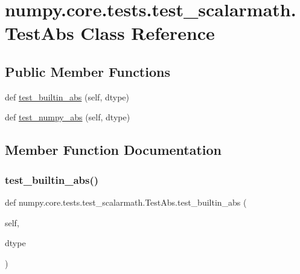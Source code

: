 \hypertarget{classnumpy_1_1core_1_1tests_1_1test__scalarmath_1_1TestAbs}{}\section{numpy.\+core.\+tests.\+test\+\_\+scalarmath.\+Test\+Abs Class Reference}
\label{classnumpy_1_1core_1_1tests_1_1test__scalarmath_1_1TestAbs}
\subsection*{Public Member Functions}
\begin{DoxyCompactItemize}
\item 
def \hyperlink{classnumpy_1_1core_1_1tests_1_1test__scalarmath_1_1TestAbs_a952d297e1e64a7bdae02256ceb433a2b}{test\+\_\+builtin\+\_\+abs} (self, dtype)
\item 
def \hyperlink{classnumpy_1_1core_1_1tests_1_1test__scalarmath_1_1TestAbs_af938a93e74a3d5d13735d5c15c204c6f}{test\+\_\+numpy\+\_\+abs} (self, dtype)
\end{DoxyCompactItemize}


\subsection{Member Function Documentation}
\mbox{\label{classnumpy_1_1core_1_1tests_1_1test__scalarmath_1_1TestAbs_a952d297e1e64a7bdae02256ceb433a2b}} 
\subsubsection{\texorpdfstring{test\+\_\+builtin\+\_\+abs()}{test\_builtin\_abs()}}
{\footnotesize\ttfamily def numpy.\+core.\+tests.\+test\+\_\+scalarmath.\+Test\+Abs.\+test\+\_\+builtin\+\_\+abs (\begin{DoxyParamCaption}\item[{}]{self,  }\item[{}]{dtype }\end{DoxyParamCaption})}

